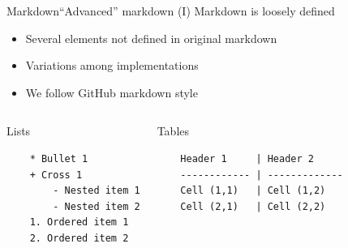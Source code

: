 \documentclass{beamer}
\begin{document}
\begin{frame}[fragile]{Markdown}{``Advanced'' markdown (I)}
	Markdown is loosely defined
		\begin{itemize}
		\item Several elements not defined in original markdown
		\item Variations among implementations
		\item We follow GitHub markdown style
		\end{itemize}

	\begin{columns}
	\begin{block}{Lists}
	\begin{verbatim}
	* Bullet 1
	+ Cross 1
	    - Nested item 1
		- Nested item 2
	1. Ordered item 1
	2. Ordered item 2
	\end{verbatim}
	\end{block}

	\begin{block}{Tables}
	\begin{verbatim}
	Header 1     | Header 2
	------------ | -------------
	Cell (1,1)   | Cell (1,2)
	Cell (2,1)   | Cell (2,2)
	\end{verbatim}
	\end{block}

	\end{columns}
\end{frame}

\end{document}
